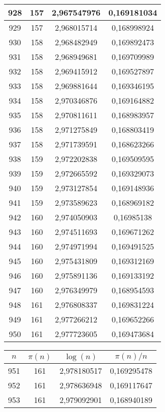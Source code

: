{\begin{minipage}[!h]{0.45\textwidth}
\begin{longtable}{cccc}
928 & 157 & 2,967547976 & 0,169181034 \\ \hline
929 & 157 & 2,968015714 & 0,168998924 \\ \hline
930 & 158 & 2,968482949 & 0,169892473 \\ \hline
931 & 158 & 2,968949681 & 0,169709989 \\ \hline
932 & 158 & 2,969415912 & 0,169527897 \\ \hline
933 & 158 & 2,969881644 & 0,169346195 \\ \hline
934 & 158 & 2,970346876 & 0,169164882 \\ \hline
935 & 158 & 2,970811611 & 0,168983957 \\ \hline
936 & 158 & 2,971275849 & 0,168803419 \\ \hline
937 & 158 & 2,971739591 & 0,168623266 \\ \hline
938 & 159 & 2,972202838 & 0,169509595 \\ \hline
939 & 159 & 2,972665592 & 0,169329073 \\ \hline
940 & 159 & 2,973127854 & 0,169148936 \\ \hline
941 & 159 & 2,973589623 & 0,168969182 \\ \hline
942 & 160 & 2,974050903 & 0,16985138 \\ \hline
943 & 160 & 2,974511693 & 0,169671262 \\ \hline
944 & 160 & 2,974971994 & 0,169491525 \\ \hline
945 & 160 & 2,975431809 & 0,169312169 \\ \hline
946 & 160 & 2,975891136 & 0,169133192 \\ \hline
947 & 160 & 2,976349979 & 0,168954593 \\ \hline
948 & 161 & 2,976808337 & 0,169831224 \\ \hline
949 & 161 & 2,977266212 & 0,169652266 \\ \hline
950 & 161 & 2,977723605 & 0,169473684 \\ \hline
\end{longtable}
\end{minipage}
\begin{minipage}[!h]{0.45\textwidth}\centering
\tiny
\begin{longtable}{cccc} \hline
\(n\) & \(\pi(n)\) & \(\log(n)\) & \(\pi(n)/n\) \\ \hline
951 & 161 & 2,978180517 & 0,169295478 \\ \hline
952 & 161 & 2,978636948 & 0,169117647 \\ \hline
953 & 161 & 2,979092901 & 0,168940189 \\ \hline

\end{longtable}
\end{minipage}}
